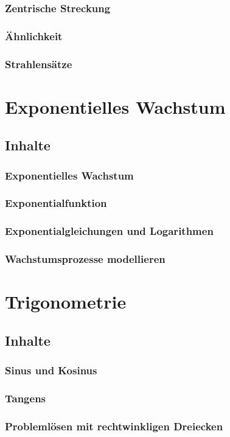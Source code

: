 \documentclass{article}
\begin{document}
\subsubsection*{Zentrische Streckung}
\subsubsection*{Ähnlichkeit}
\subsubsection*{Strahlensätze}
\newpage
\section{Exponentielles Wachstum}
\subsection{Inhalte}
\subsubsection*{Exponentielles Wachstum}
\subsubsection*{Exponentialfunktion}
\subsubsection*{Exponentialgleichungen und Logarithmen}
\subsubsection*{Wachstumsprozesse modellieren}
\newpage

\section{Trigonometrie}
\subsection{Inhalte}
\subsubsection*{Sinus und Kosinus}
\subsubsection*{Tangens}
\subsubsection*{Problemlösen mit rechtwinkligen Dreiecken}
\end{document}
